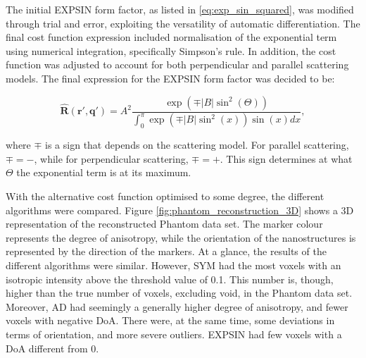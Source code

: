 The initial EXPSIN form factor, as listed in \eqref{eq:exp_sin_squared}, was modified through trial and error, exploiting the versatility of automatic differentiation.
The final cost function expression included normalisation of the exponential term using numerical integration, specifically Simpson's rule.
In addition, the cost function was adjusted to account for both perpendicular and parallel scattering models.
The final expression for the EXPSIN form factor was decided to be:

\begin{equation}
    \label{eq:final_exp_sin_squared}
    \bm{\widehat{R}}(\bm{r'}, \bm{q'}) = A^{2} \frac{\exp\left( \mp |B| \sin^{2}(\Theta) \right)}{\int_{0}^{\pi} \exp\left( \mp |B| \sin^{2}(x) \right) \sin(x) dx},
\end{equation}

where $\mp$ is a sign that depends on the scattering model. For parallel scattering, $\mp = -$, while for perpendicular scattering, $\mp = +$.
This sign determines at what $\Theta$ the exponential term is at its maximum.

With the alternative cost function optimised to some degree, the different algorithms were compared.
Figure \ref{fig:phantom_reconstruction_3D} shows a 3D representation of the reconstructed Phantom data set.
The marker colour represents the degree of anisotropy, while the orientation of the nanostructures is represented by the direction of the markers.
At a glance, the results of the different algorithms were similar.
However, SYM had the most voxels with an isotropic intensity above the threshold value of 0.1.
This number is, though, higher than the true number of voxels, excluding void, in the Phantom data set.
Moreover, AD had seemingly a generally higher degree of anisotropy, and fewer voxels with negative DoA.
There were, at the same time, some deviations in terms of orientation, and more severe outliers.
EXPSIN had few voxels with a DoA different from $0$.

